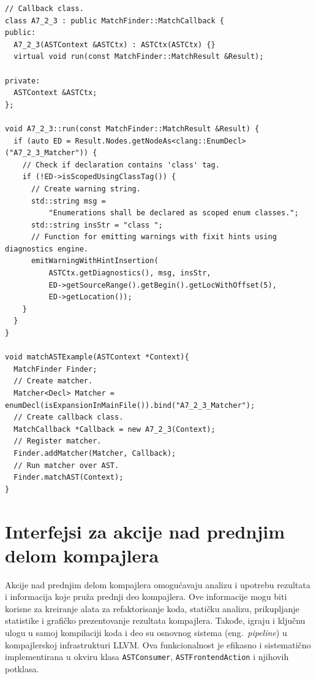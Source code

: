 \documentclass[12pt,oneside]{memoir}
\begin{document}
\begin{lstlisting}[style=customc,  caption={Primer upariva\v{c}a koji pronalazi sve deklaracije enumeratora koje ne koriste sintaksu \texttt{enum class}. Ovaj primer demonstrira i upotrebu klasa \texttt{MatchFinder}, \texttt{MatchCallback} i \texttt{MatchResult}.}, label=lst:MatcherList]
// Callback class.
class A7_2_3 : public MatchFinder::MatchCallback {
public:
  A7_2_3(ASTContext &ASTCtx) : ASTCtx(ASTCtx) {}
  virtual void run(const MatchFinder::MatchResult &Result);

private:
  ASTContext &ASTCtx;
};

void A7_2_3::run(const MatchFinder::MatchResult &Result) {
  if (auto ED = Result.Nodes.getNodeAs<clang::EnumDecl>("A7_2_3_Matcher")) {
    // Check if declaration contains 'class' tag.
    if (!ED->isScopedUsingClassTag()) {
      // Create warning string.
      std::string msg =
          "Enumerations shall be declared as scoped enum classes.";
      std::string insStr = "class ";
      // Function for emitting warnings with fixit hints using diagnostics engine.
      emitWarningWithHintInsertion(
          ASTCtx.getDiagnostics(), msg, insStr,
          ED->getSourceRange().getBegin().getLocWithOffset(5),
          ED->getLocation());
    }
  }
}

void matchASTExample(ASTContext *Context){
  MatchFinder Finder;
  // Create matcher.
  Matcher<Decl> Matcher = enumDecl(isExpansionInMainFile()).bind("A7_2_3_Matcher");
  // Create callback class.
  MatchCallback *Callback = new A7_2_3(Context);
  // Register matcher.
  Finder.addMatcher(Matcher, Callback);
  // Run matcher over AST.
  Finder.matchAST(Context);
}
\end{lstlisting}


\section{Interfejsi za akcije nad prednjim delom kompajlera}
\label{sec:interfejsi}

Akcije nad prednjim delom kompajlera omogu\'{c}avaju analizu i upotrebu rezultata i informacija koje pru\v{z}a prednji deo kompajlera. Ove informacije mogu biti korisne za kreiranje alata za refaktorisanje koda, stati\v{c}ku analizu, prikupljanje statistike i grafi\v{c}ko prezentovanje rezultata kompajlera. Takođe, igraju i klju\v{c}nu ulogu u samoj kompilaciji koda i deo su osnovnog sistema (eng.~\textit{pipeline}) u kompajlerskoj infrastrukturi LLVM.
Ova funkcionalnost je efikasno i sistemati\v{c}no implementirana u okviru klasa \texttt{ASTConsumer}, \texttt{ASTFrontendAction} i njihovih potklasa.
\end{document}
